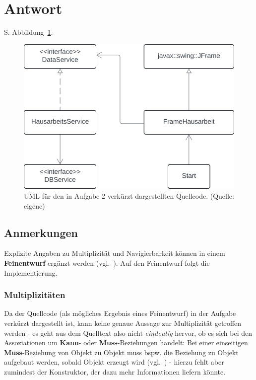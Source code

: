 \section*{Antwort}

S. Abbildung~\ref{fig:aufgabe2}.\\

\begin{figure}
    \centering
    \includegraphics[scale=0.5]{chapters/aufgabe 2/img/aufgabe2}
    \caption{UML für den in Aufgabe 2 verkürzt dargestellten Quellcode. (Quelle: eigene)}
    \label{fig:aufgabe2}
\end{figure}

\subsection*{Anmerkungen}
Explizite Angaben zu Multiplizität und Navigierbarkeit können in einem \textbf{Feinentwurf} ergänzt werden (vgl.~\cite[415]{Bal05}). Auf den Feinentwurf folgt die Implementierung.\\

\subsubsection*{Multiplizitäten}
Da der Quellcode (als mögliches Ergebnis eines Feinentwurf) in der Aufgabe verkürzt dargestellt ist, kann keine genaue Aussage zur Multiplizität getroffen werden - es geht aus dem Quelltext also nicht \textit{eindeutig} hervor, ob es sich bei den Assoziationen um \textbf{Kann}- oder \textbf{Muss}-Beziehungen handelt: Bei einer einseitigen \textbf{Muss}-Beziehung von Objekt  zu Objekt  muss bspw. die Beziehung zu Objekt  aufgebaut werden, sobald Objekt  erzeugt wird (vgl.~\cite[43]{Bal05}) - hierzu fehlt aber zumindest der Konstruktor, der dazu mehr Informationen liefern könnte.\\

